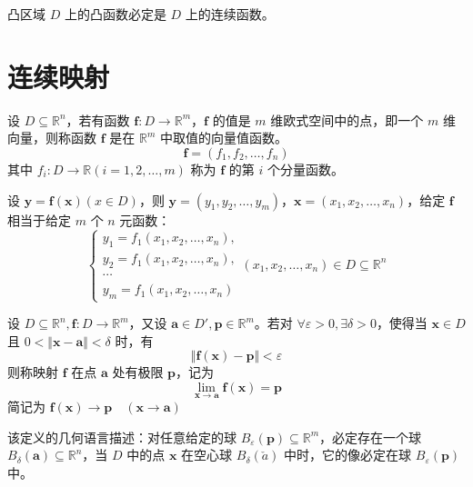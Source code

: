 \begin{proposition}
    凸区域 $D$ 上的凸函数必定是 $D$ 上的连续函数。
\end{proposition}



\section{连续映射}

\begin{definition}
    设 $D \subseteq \mathbb{R}^n$，若有函数 $\bm{f}: D \to \mathbb{R}^m$，$\bm{f}$ 的值是 $m$ 维欧式空间中的点，即一个 $m$ 维向量，则称函数 $\bm{f}$ 是在 $\mathbb{R}^m$ 中取值的向量值函数。
    \[
        \bm{f} = (f_1, f_2, \ldots, f_n)
    \]
    其中 $f_{i}: D \to \mathbb{R}(i = 1, 2, \ldots, m)$ 称为 $\bm{f}$ 的第 $i$ 个分量函数。

    设 $\bm{y} = \bm{f}(\bm{x})(x \in D)$，则 $\bm{y} = (y_1, y_2, \ldots, y_m)$，$\bm{x} = (x_1, x_2, \ldots, x_n)$，给定 $\bm{f}$ 相当于给定 $m$ 个 $n$ 元函数：
    \begin{equation*}
        \begin{cases}
            y_1 = f_{1}(x_1, x_2, \ldots, x_n), \\
            y_2 = f_{1}(x_1, x_2, \ldots, x_n), \\
            \cdots                              \\
            y_m = f_{1}(x_1, x_2, \ldots, x_n)
        \end{cases} (x_1, x_2, \ldots, x_n) \in D \subseteq \mathbb{R}^n
    \end{equation*}
\end{definition}

\begin{definition}
    设 $D \subseteq \mathbb{R}^n, \bm{f}: D \to \mathbb{R}^m$，又设 $\bm{a} \in D', \bm{p} \in \mathbb{R}^m$。若对 $\forall \varepsilon > 0, \exists \delta > 0$，使得当 $\bm{x} \in D$ 且 $0 < \Vert \bm{x} - \bm{a} \Vert < \delta$ 时，有
    \[
        \Vert\bm{f}(\bm{x}) - \bm{p} \Vert < \varepsilon
    \]
    则称映射 $\bm{f}$ 在点 $\bm{a}$ 处有极限 $\bm{p}$，记为
    \[
        \lim_{\bm{x} \to \bm{a}}\bm{f}(\bm{x}) = \bm{p}
    \]
    简记为
    $\bm{f}(\bm{x}) \to \bm{p} \quad (\bm{x} \to \bm{a})$
\end{definition}

\begin{remark}
    该定义的几何语言描述：对任意给定的球 $B_{\varepsilon}(\bm{p}) \subseteq \mathbb{R}^m$，必定存在一个球 $B_{\delta}(\bm{a}) \subseteq \mathbb{R}^n$，当 $D$ 中的点 $\bm{x}$ 在空心球 $B_{\delta}(\check{a})$ 中时，它的像必定在球 $B_{\varepsilon}(\bm{p})$ 中。
\end{remark}

